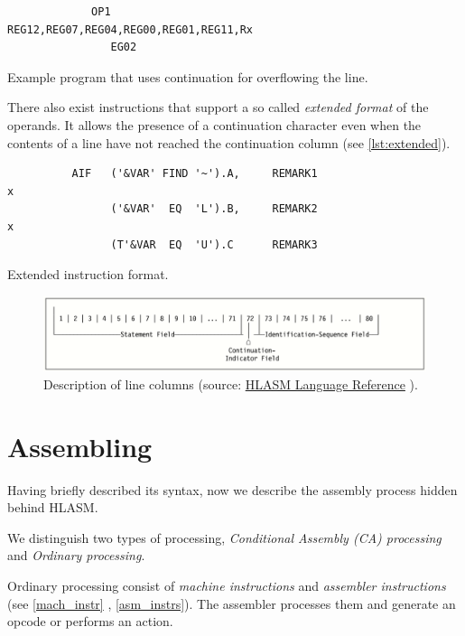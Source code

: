 \begin{listing}[p]
	\begin{verbatim}
             OP1                   REG12,REG07,REG04,REG00,REG01,REG11,Rx
                EG02
	\end{verbatim}
	\caption{Example program that uses continuation for overflowing the line.}
	\label{lst:overflow}
\end{listing}

There also exist instructions that support a so called \emph{extended format} of the operands. It allows the presence of a continuation character even when the contents of a line have not reached the continuation column (see \cref{lst:extended}).

\begin{listing}[p]
\begin{verbatim}
          AIF   ('&VAR' FIND '~').A,     REMARK1                        x
                ('&VAR'  EQ  'L').B,     REMARK2                        x
                (T'&VAR  EQ  'U').C      REMARK3 
\end{verbatim}
\caption{Extended instruction format.}
\label{lst:extended}
\end{listing}

\begin{figure}
	\includegraphics[width=\textwidth]{img/line}
	\caption{Description of line columns (source: \href{https://www-01.ibm.com/servers/resourcelink/svc00100.nsf/pages/zOSV2R3sc264940/$file/asmr1023.pdf}{HLASM Language Reference} ).}
	\label{fig01:line$}
\end{figure}


\section{Assembling}
\label{Assembling}

Having briefly described its syntax, now we describe the assembly process hidden behind HLASM. 

We distinguish two types of processing, \emph{Conditional Assembly (CA) processing} and \emph{Ordinary processing}.

Ordinary processing consist of \emph{machine instructions} and \emph{assembler instructions} (see \cref{mach_instr} , \cref{asm_instrs}). The assembler processes them and generate an opcode or performs an action.

